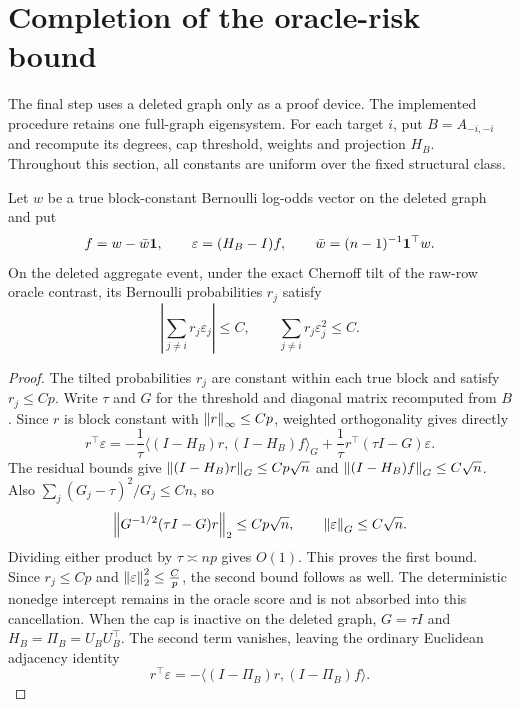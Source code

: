 \section{Completion of the oracle-risk bound}
\label{sec:probability}

The final step uses a deleted graph only as a proof device. The
implemented procedure retains one full-graph eigensystem.
For each target $i$, put $B=A_{-i,-i}$ and recompute its degrees,
cap threshold, weights and projection $H_B$. Throughout this section, all constants
are uniform over the fixed structural class.

\begin{lemma}
\label{lem:sbm-floor-cancellation}
Let $w$ be a true block-constant Bernoulli log-odds vector on the
deleted graph and put
\[
 f=w-\bar w\mathbf 1,\qquad \varepsilon=(H_B-I)f,
 \qquad \bar w=(n-1)^{-1}\mathbf 1^\top w.
\]
On the deleted aggregate event, under the exact Chernoff tilt of
the raw-row oracle contrast, its Bernoulli probabilities $r_j$
satisfy
\begin{equation}\label{eq:sbm-floor-tilt}
 \left|\sum_{j\ne i}r_j\varepsilon_j\right|\le C,
 \qquad \sum_{j\ne i}r_j\varepsilon_j^2\le C.
\end{equation}
\end{lemma}

\begin{proof}
The tilted probabilities $r_j$ are constant within each true block
and satisfy $r_j\le Cp$. Write $\tau$ and $G$ for the threshold
and diagonal matrix recomputed from $B$. Since $r$ is block constant with $\left\lVert r\right\rVert_\infty\le Cp$,
weighted orthogonality gives directly
\[
 r^\top\varepsilon
 =-\frac1\tau\big\langle(I-H_B)r,(I-H_B)f\big\rangle_G
       +\frac1\tau r^\top(\tau I-G)\varepsilon.
\]
The residual bounds give
$\left\lVert(I-H_B)r\right\rVert_G\le Cp\sqrt n$ and
$\left\lVert(I-H_B)f\right\rVert_G\le C\sqrt n$.
Also $\sum_j(G_j-\tau)^2/G_j\le Cn$, so
\[
 \left\lVert G^{-1/2}(\tau I-G)r\right\rVert_2\le Cp\sqrt n,
 \qquad \left\lVert\varepsilon\right\rVert_G\le C\sqrt n.
\]
Dividing either product by $\tau\asymp np$ gives $O(1)$.
This proves the first bound. Since $r_j\le Cp$ and
$\left\lVert\varepsilon\right\rVert_2^2\le \frac{C}{p}$, the second bound follows as well.
The deterministic nonedge intercept remains in the oracle score
and is not absorbed into this cancellation.
When the cap is inactive on the deleted graph, $G=\tau I$ and
$H_B=\Pi_B=U_BU_B^\top$. The second term vanishes, leaving the
ordinary Euclidean adjacency identity
\[
 r^\top\varepsilon
 =-\big\langle(I-\Pi_B)r,(I-\Pi_B)f\big\rangle.
\]
\end{proof}

